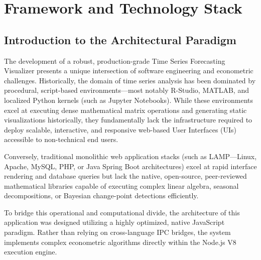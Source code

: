 \chapter{Framework and Technology Stack}
\label{ch:framework_tech_stack}

\section{Introduction to the Architectural Paradigm}
The development of a robust, production-grade Time Series Forecasting Visualizer presents a unique intersection of software engineering and econometric challenges. Historically, the domain of time series analysis has been dominated by procedural, script-based environments---most notably R-Studio, MATLAB, and localized Python kernels (such as Jupyter Notebooks). While these environments excel at executing dense mathematical matrix operations and generating static visualizations historically, they fundamentally lack the infrastructure required to deploy scalable, interactive, and responsive web-based User Interfaces (UIs) accessible to non-technical end users. 

Conversely, traditional monolithic web application stacks (such as LAMP—Linux, Apache, MySQL, PHP, or Java Spring Boot architectures) excel at rapid interface rendering and database queries but lack the native, open-source, peer-reviewed mathematical libraries capable of executing complex linear algebra, seasonal decompositions, or Bayesian change-point detections efficiently. 

To bridge this operational and computational divide, the architecture of this application was designed utilizing a highly optimized, native JavaScript paradigm. Rather than relying on cross-language IPC bridges, the system implements complex econometric algorithms directly within the Node.js V8 execution engine.

